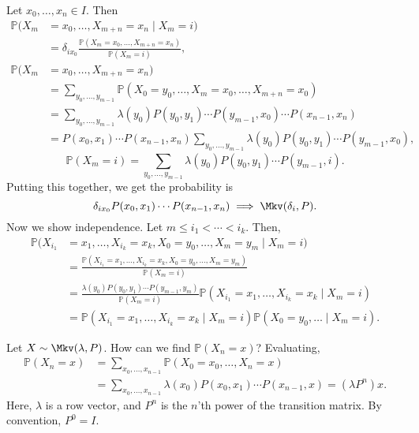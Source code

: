 \documentclass[12pt]{article}
\begin{document}
\begin{proofbox}
	Let $x_0, \ldots, x_n \in I$. Then
\begin{align*}
	\mathbb{P}(X_m &= x_0, \ldots, X_{m+n} = x_n \mid X_m = i) \\
		       &= \delta_{ix_0} \frac{\mathbb{P}(X_m = x_0, \ldots, X_{m+n} = x_n)}{\mathbb{P}(X_m = i)}, \\
	\mathbb{P}(X_m &= x_0, \ldots, X_{m+n} = x_n) \\
		       &= \sum_{y_0,\ldots, y_{m-1}}\mathbb{P}(X_0 = y_0, \ldots, X_{m} = x_0, \ldots, X_{m+n} = x_0) \\
		       &= \sum_{y_0, \ldots, y_{m-1}} \lambda(y_0) P(y_0, y_1) \cdots P(y_{m-1}, x_0) \cdots P(x_{n-1}, x_n) \\
		       &= P(x_0, x_1) \cdots P(x_{n-1}, x_n) \sum_{y_0, \ldots, y_{m-1}} \lambda(y_0) P(y_0, y_1) \cdots P(y_{m-1}, x_0),
\end{align*}
\[
	\mathbb{P}(X_m = i) = \sum_{y_0, \ldots, y_{m-1}} \lambda(y_0) P(y_0, y_1) \cdots P(y_{m-1}, i).
\]
Putting this together, we get the probability is
\[
	\delta_{ix_0}P(x_0, x_1)\cdots P(x_{n-1}, x_n) \implies \Mkv(\delta_i, P)
.\]
Now we show independence. Let $m \leq i_1 < \cdots < i_k$. Then,
\begin{align*}
	\mathbb{P}(X_{i_1} &= x_1, \ldots, X_{i_k} = x_k, X_0 = y_0, \ldots, X_m = y_m \mid X_{m} = i) \\
			   &= \frac{\mathbb{P}(X_{i_1} = x_1, \ldots, X_{i_k} = x_k, X_0 = y_0, \ldots, X_m = y_m)}{\mathbb{P}(X_m = i)} \\
			   &= \frac{\lambda(y_0) P(y_0, y_1) \cdots P(y_{m-1}, y_m)}{\mathbb{P}(X_m = i)} \mathbb{P}(X_{i_1} = x_1, \ldots, X_{i_k} = x_k \mid X_{m} = i) \\
			   &= \mathbb{P}(X_{i_1} = x_1, \ldots, X_{i_k} = x_k \mid X_{m} = i) \mathbb{P}(X_0 = y_0, \ldots \mid X_m = i).
\end{align*}
\end{proofbox}

Let $X \sim \Mkv(\lambda, P)$. How can we find $\mathbb{P}(X_n = x)$? Evaluating,
\begin{align*}
	\mathbb{P}(X_n = x) &= \sum_{x_0, \ldots, x_{n-1}}\mathbb{P}(X_0 = x_0, \ldots, X_n = x) \\
			    &= \sum_{x_0, \ldots, x_{n-1}} \lambda(x_0) P(x_0, x_1) \cdots P(x_{n-1}, x) = (\lambda P^{n})x.
\end{align*}
Here, $\lambda$ is a row vector, and $P^{n}$ is the $n$'th power of the transition matrix. By convention, $P^{0} = I$.
\end{document}
